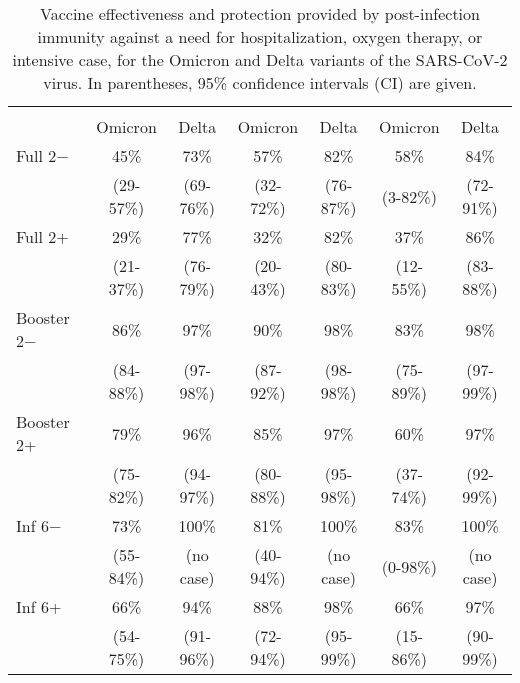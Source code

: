 \documentclass[a4paper,12pt]{article}
\def\nocase{no case}
\begin{document}
\thispagestyle{empty}
\setcounter{table}{1}
%

\begin{table}[!ht]
\caption{Vaccine effectiveness and protection provided by post-infection immunity against a need for hospitalization, oxygen therapy, or intensive case, for the Omicron and Delta variants of the SARS-CoV-2 virus. In parentheses, 95\% confidence intervals (CI) are given.}
\vspace{2mm}
\label{tabHalone}
\centering
\begin{tabular}{|l|c|c|c|c|c|c|}
\hline
\cellcolor{gray!20}{\it Vaccination}&\multicolumn{2}{c|}{\cellcolor{gray!20}{\it Hospitalization}}&\multicolumn{2}{c|}{\cellcolor{gray!20}{\it Oxygen therapy}}&\multicolumn{2}{c|}{\cellcolor{gray!20}{\it Intensive care}} \\
\cline{2-7}
\cellcolor{gray!20}{\it or infection} & \cellcolor{gray!20} Omicron & \cellcolor{gray!20} Delta & \cellcolor{gray!20} Omicron & \cellcolor{gray!20} Delta & \cellcolor{gray!20} Omicron & \cellcolor{gray!20} Delta \\
\hline
Full 2$-$&45\%&73\% &57\%  & 82\%&58\%&84\% \\
&(29-57\%)&(69-76\%)&(32-72\%) & (76-87\%)& (3-82\%)& (72-91\%)\\
\cellcolor{gray!10}Full 2+&\cellcolor{gray!10}29\% &\cellcolor{gray!10}77\%&\cellcolor{gray!10}32\% &\cellcolor{gray!10}82\% &\cellcolor{gray!10}37\% &\cellcolor{gray!10}86\% \\
\cellcolor{gray!10}&\cellcolor{gray!10}(21-37\%) &\cellcolor{gray!10}(76-79\%)&\cellcolor{gray!10} (20-43\%)&\cellcolor{gray!10} (80-83\%)&\cellcolor{gray!10} (12-55\%)&\cellcolor{gray!10} (83-88\%)\\
Booster 2$-$&86\%&97\%&90\% &98\% &83\% &98\% \\
&(84-88\%)&(97-98\%)& (87-92\%)& (98-98\%)&(75-89\%)& (97-99\%)\\
\cellcolor{gray!10}Booster 2+&\cellcolor{gray!10}79\% &\cellcolor{gray!10}96\% &\cellcolor{gray!10}85\% &\cellcolor{gray!10}97\% &\cellcolor{gray!10}60\% &\cellcolor{gray!10}97\% \\
\cellcolor{gray!10}&\cellcolor{gray!10} (75-82\%)&\cellcolor{gray!10}(94-97\%)&\cellcolor{gray!10} (80-88\%)&\cellcolor{gray!10} (95-98\%)&\cellcolor{gray!10} (37-74\%)&\cellcolor{gray!10} (92-99\%)\\
Inf 6$-$& 73\%&100\%&81\% &100\% &83\%&100\% \\
& (55-84\%)& (\nocase)& (40-94\%)& (no case)& (0-98\%)& (no case)\\
\cellcolor{gray!10}Inf 6+&\cellcolor{gray!10}
66\% 
&\cellcolor{gray!10}94\%&\cellcolor{gray!10}88\% &\cellcolor{gray!10}98\% &\cellcolor{gray!10}66\% &\cellcolor{gray!10}97\% \\
\cellcolor{gray!10}&\cellcolor{gray!10}
(54-75\%) 
&\cellcolor{gray!10}(91-96\%)&\cellcolor{gray!10} (72-94\%)&\cellcolor{gray!10} (95-99\%)&\cellcolor{gray!10} (15-86\%)&\cellcolor{gray!10} (90-99\%)\\
\hline
\end{tabular}
\end{table}
\end{document}
